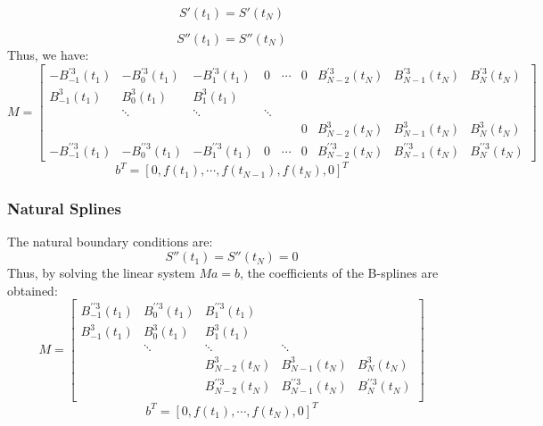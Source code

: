 \documentclass[a4paper]{article}
\begin{document}
\begin{equation}
    S'(t_1) = S'(t_N)
\end{equation}

\begin{equation}
    S''(t_1) = S''(t_N)
\end{equation}
Thus, we have:
\begin{equation}
    M = \begin{bmatrix}
        -B_{-1}^{\prime3}(t_1)&-B_{0}^{\prime3}(t_1)&-B_{1}^{\prime3}(t_1) &0&\cdots&0&B_{N-2}^{\prime3}(t_N)&B_{N-1}^{\prime3}(t_N)&B_{N}^{\prime3}(t_N) \\
        B_{-1}^3(t_1)&B_{0}^3(t_1) &B_{1}^3(t_1) \\
        & \ddots & \ddots & \ddots \\
        &&&&&0 & B_{N-2}^3(t_N)&B_{N-1}^3(t_N)&B_{N}^3(t_N)\\
        -B_{-1}^{\prime\prime3}(t_1)&-B_{0}^{\prime\prime3}(t_1)&-B_{1}^{\prime\prime3}(t_1) &0&\cdots&0&B_{N-2}^{\prime\prime3}(t_N)&B_{N-1}^{\prime\prime3}(t_N)&B_{N}^{\prime\prime3}(t_N)
    \end{bmatrix}
\end{equation}
\begin{equation}
    b^T = [0,f(t_1),\cdots,f(t_{N-1}),f(t_N),0]^T
\end{equation}

\subsubsection{Natural Splines}
The natural boundary conditions are:
\begin{equation}
    S''(t_1) = S''(t_N)=0
\end{equation}
Thus, by solving the linear system $Ma=b$, the coefficients of the B-splines are obtained:
\begin{equation}
    M=\begin{bmatrix}
        B_{-1}^{\prime \prime 3}(t_1)& B_{0}^{\prime \prime 3}(t_1) &B_{1}^{\prime \prime 3}(t_1)\\
        B_{-1}^3(t_1) &B_{0}^3(t_1)&B_{1}^3(t_1)\\
        &\ddots &\ddots&\ddots&\\
        &&B_{N-2}^3(t_N)&B_{N-1}^3(t_N)&B_{N}^3(t_N)\\
        &&B_{N-2}^{\prime \prime 3}(t_N)&B_{N-1}^{\prime \prime 3}(t_N)&B_{N}^{\prime \prime 3}(t_N)\\
    \end{bmatrix}
\end{equation}
\begin{equation}
    b^T = [0,f(t_1),\cdots,f(t_N),0]^T
\end{equation}
\end{document}
